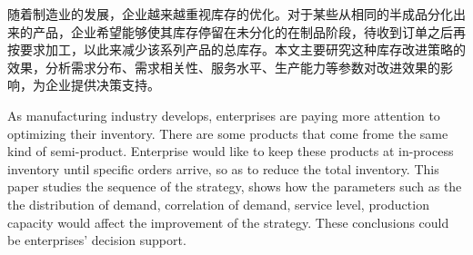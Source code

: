 
 

\makeatletter
\ifthu@bachelor\relax\else
  \ifthu@doctor
  \else
    \ifthu@master
    \fi
  \fi
\fi
\makeatother





\begin{cabstract}

随着制造业的发展，企业越来越重视库存的优化。对于某些从相同的半成品分化出来的产品，企业希望能够使其库存停留在未分化的在制品阶段，待收到订单之后再按要求加工，以此来减少该系列产品的总库存。本文主要研究这种库存改进策略的效果，分析需求分布、需求相关性、服务水平、生产能力等参数对改进效果的影响，为企业提供决策支持。


  
  
  
\end{cabstract}






\begin{eabstract} 

As manufacturing industry develops, enterprises are paying more attention to optimizing their inventory. There are some products that come frome the same kind of semi-product. Enterprise would like to keep these products at in-process inventory until specific orders arrive, so as to reduce the total inventory. This paper studies the sequence of the strategy, shows how the parameters such as the the distribution of demand, correlation of demand, service level, production capacity would affect the improvement of the strategy. These conclusions could be enterprises' decision support.





\end{eabstract}

